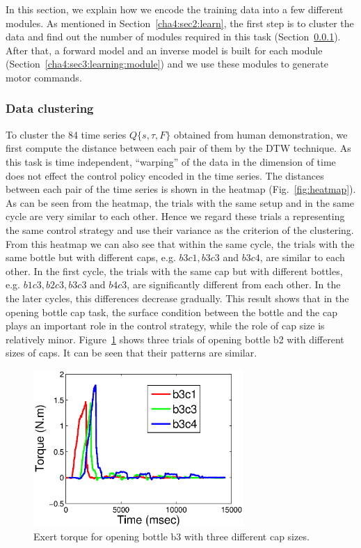 In this section, we explain how we encode the training data into a few different modules. As mentioned in Section~\ref{cha4:sec2:learn}, the first step is to cluster the data and find out the number of modules required in this task (Section~\ref{cha4:sec3:learning:clustering}). After that, a forward model and an inverse model is built for each module (Section~\ref{cha4:sec3:learning:module}) and we use these modules to generate motor commands.

\subsubsection{Data clustering}
\label{cha4:sec3:learning:clustering}
To cluster the 84 time series $Q\{s,\tau,F\}$ obtained from human demonstration, we first compute the distance between each pair of them by the DTW technique. As this task is time independent, ``warping'' of the data in the dimension of time does not effect the control policy encoded in the time series. The distances between each pair of the time series is shown in the heatmap (Fig.~\ref{fig:heatmap}). As can be seen from the heatmap, the trials with the same setup and in the same cycle are very similar to each other. Hence we regard these trials a representing the same control strategy and use their variance as the criterion of the clustering. From this heatmap we can also see that within the same cycle, the trials with the same bottle but with different caps, e.g. $b3c1, b3c3$ and $b3c4$, are similar to each other. In the first cycle, the trials with the same cap but with different bottles, e.g. $b1c3, b2c3, b3c3$ and $b4c3$, are significantly different from each other. In the the later cycles, this differences decrease gradually. This result shows that in the opening bottle cap task, the surface condition between the bottle and the cap plays an important role in the control strategy, while the role of cap size is relatively minor. Figure~\ref{fig:cappatterns} shows three trials of opening bottle b2 with different sizes of caps. It can be seen that their patterns are similar.

\begin{figure}[ht!]
    \centering
    \includegraphics[width=8cm]{./fig_cha4/c1c3c4_time_T.eps}
    \caption{  {Exert torque for opening bottle b3 with three different cap sizes.}
}
\label{fig:cappatterns}
\end{figure}

